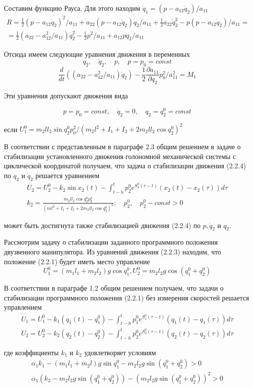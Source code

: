 Составим функцию Рауса. Для этого находим $\dot q_1 = (p - a_12 \dot q_2) / a_{11}$
$$
\begin{array}{c}
\displaystyle R = \frac12 (p - a_{12} \dot q_2)^2 / a_{11} + a_{22} (p - a_{12} \dot q_2) \dot q_2 / a_{11} + \frac12 a_{22} \dot q_2^2 - p (p - a_{12} \dot q_2) / a_{11} =\\
\displaystyle = \frac12 (a_22 - a_{12}^2 / a_{11}) \dot q_2^2 - \frac12 p^2 / a_{11} + a_{12} p \dot q_2 / a_{11}
\end{array}
$$

Отсюда имеем следующие уравнения движения в переменных $$q_2, \quad \dot q_2, \quad p, \quad p = p_0 = const$$
$$\frac{d}{dt} ((a_{22} - a_{12}^2 / a_{11}) \dot q_2) - \frac12 \frac{\partial a_{11}}{\partial q_2} p_0^2 / a_{11}^2 = M_1$$


Эти уравнения допускают движения вида 

\begin{equation}
p = p_0 = const, \quad \dot q_2 = 0, \quad q_2 = q_2^0 = const
\end{equation}

если $U_1^0 = m_2 l l_2 \sin q_2^0 p_0^2 / (m_2 l^2 + I_1 + I_2 + 2 m_2 l l_2 \cos q_2^0)^2$

В соответствии с представленным в параграфе 2.3 общим решением в задаче о стабилизации установленного движения голономной механической системы с циклической координатой получаем, что задача о стабилизации движения (2.2.4) по $q_2$ и $\dot q_2$ решается уравнением
$$
\begin{array}{c}
\displaystyle U_2 = U_2^0 - k_2 \sin x_2 (t) - \int_{t-h}^{t} p_2^0 e^{S_2^0 (\tau - t)} (x_2 (t) - x_2 (\tau)) d \tau\\
\displaystyle k_2 = \frac{m_2 l l_2 \cos q_2^0 p_0^2}{(m l^2 + I_1 + I_2 + 2 m_2 l l_2 \cos q_2^0)^2}; \quad p_2^0, \quad p_2^0 - const > 0
\end{array}
$$

может быть достигнута также стабилизацией движения (2.2.4) по $p, \dot q_2$ и $q_2.$

Рассмотрим задачу о стабилизации заданного программного положения двузвенного манипулятора. Из уравнений движения (2.2.3) находим, что положение (2.2.1) будет иметь место управление $$U_1^0 = (m_1 l_1 + m_2 l_2) g \cos q_1^0, U_2^0 = m_2 l_2 g \cos (q_1^0 + q_2^0)$$

В соответствии в параграфе 1.2 общим решением получаем, что задачи о стабилизации программного положения (2.2.1) без измерения скоростей решается управлением 
$$
\begin{array}{l}
\displaystyle U_1 = U_1^0 - k_1 (q_1(t) - q_1^0) - \int_{t-h}^{t} p_1^0 e^{S_1^0 (\tau - t)} (q_1(t) - q_1(\tau)) d \tau\\
\displaystyle U_2 = U_2^0 - k_2 (q_2(t) - q_2^0) - \int_{t-h}^{t} p_2^0 e^{S_2^0 (\tau - t)} (q_2(t) - q_2(\tau)) d \tau
\end{array}
$$

где коэффициенты $k_1$ и $k_2$ удовлетворяет условиям 
$$
\begin{array}{c}
\alpha_1 k_1 - (m_1 l_1 + m_2 l) g \sin q_1^0 - m_2 l_2 g \sin (q_1^0 + q_2^0) > 0\\
\alpha_1 (k_2 - m_2 l_2 g \sin (q_1^0 + q_2^0)) - (m_2 l_2 g \sin (q_1^0 + q_2^0))^2 > 0
\end{array}
$$